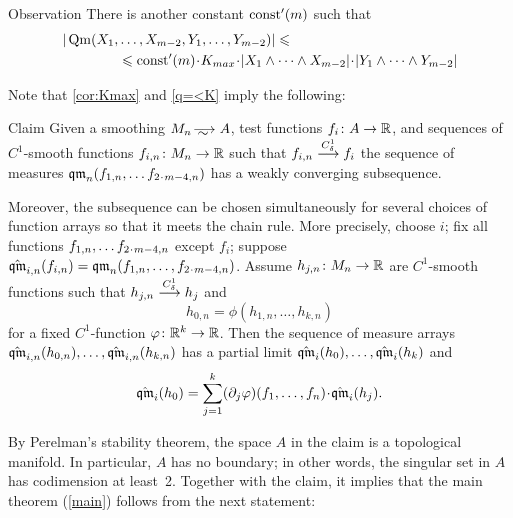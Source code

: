 \begin{thm}{Observation}\label{q=<K}
There is another constant $\mathrm{const}'(m)$ such that 
\begin{align*}
|\Qm(X_1,&\dots,X_{m-2},Y_1,\dots,Y_{m-2})|\le
\\
&\le 
\const'(m)\cdot K_{max}\cdot|X_1\wedge\dots\wedge X_{m-2}|\cdot |Y_1\wedge\dots\wedge Y_{m-2}|
\end{align*}

\end{thm}

Note that \ref{cor:Kmax} and \ref{q=<K} imply the following:

\begin{thm}{Claim}\label{clm:weak-partial-limit}
Given a smoothing $M_n\smooths{} A$,
test functions $f_i\:A\zz\to \RR$,
and sequences of $C^1$-smooth functions $f_{i,n}\colon M_n\to \mathbb{R}$ such that 
$f_{i,n}\zz\smoothto f_i$ the sequence of measures 
$\qm_n(f_{1,n},\zz\dots f_{2\cdot m-4,n})$ has a weakly converging subsequence.

Moreover, the subsequence can be chosen simultaneously for several choices of function arrays so that it meets the chain rule.
More precisely, choose $i$; fix all functions $f_{1,n},\zz\dots f_{2\cdot m-4,n}$ except $f_i$;
suppose $\hat\qm_{i,n}(f_{i,n})=\qm_n(f_{1,n},\zz\dots, f_{2\cdot m-4,n})$.
Assume $h_{j,n}\colon M_n\to \mathbb{R}$ are $C^1$-smooth functions such that 
$h_{j,n}\zz\smoothto h_j$ and 
\[h_{0,n}=\phi(h_{1,n},\dots,h_{k,n})\]
for a fixed $C^1$-function $\varphi\colon\mathbb{R}^k\to\mathbb{R}$.
Then the sequence of measure arrays $\hat{\operatorname{\mathfrak{qm}}}_{i,n}(h_{0,n}),\dots,\hat{\operatorname{\mathfrak{qm}}}_{i,n}(h_{k,n})$
has a partial limit $\hat\qm_{i}(h_0),\zz\dots,\hat\qm_{i}(h_k)$ and
\[\hat\qm_{i}(h_0)=\sum_{j=1}^k (\partial_j\phi)(f_1,\dots,f_n)\cdot\hat\qm_{i}(h_j).\]

\end{thm}


By Perelman's stability theorem, the space $A$ in the claim is a topological manifold.
In particular, $A$ has no boundary;
in other words, the singular set in $A$ has codimension at least~2.
Together with the claim, it implies that the main theorem (\ref{main}) follows from the next statement:

